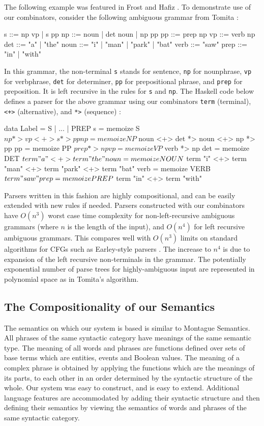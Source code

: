 \documentclass[../main.tex]{subfiles}
\begin{document}
\begin{refsection}
The following example was featured in Frost and Hafiz \cite{frosthafiz2008}. To demonstrate use of our combinators, consider the following ambiguous grammar from Tomita \cite{tomita1985}:
\begin{code}
	s    ::= np vp | s pp    np   ::= noun  | det noun | np pp
	pp   ::= prep np         vp   ::= verb np
	det  ::= "a"   | "the"   noun ::= "i"   | "man" | "park" | "bat"
	verb ::= "saw"           prep ::= "in"  | "with"
\end{code}
In this grammar, the non-terminal \texttt{s} stands for sentence, \texttt{np} for nounphrase, \texttt{vp} for verbphrase, \texttt{det} for determiner, \texttt{pp} for prepositional phrase, and \texttt{prep} for preposition.  It is left recursive in the rules for \texttt{s} and \texttt{np}.
The Haskell code below defines a parser for the above grammar using our combinators \texttt{term} (terminal), \texttt{<+>} (alternative), and \texttt{*>} (sequence) \cite{frosthafiz2008}:
\begin{code}
	data Label = S | ... | PREP
	s    = memoize S    $ np *> vp <+> s *> pp
	np   = memoize NP   $ noun <+> det *> noun <+> np *> pp
	pp   = memoize PP   $ prep *> np
	vp   = memoize VP   $ verb *> np
	det  = memoize DET  $ term "a" <+> term "the"
	noun = memoize NOUN
	$ term "i" <+> term "man" <+> term "park" <+> term "bat"
	verb = memoize VERB $ term "saw"
	prep = memoize PREP $ term "in" <+> term "with"
\end{code}
Parsers written in this fashion are highly compositional, and can be easily extended with new rules if needed.  Parsers constructed with our combinators have $O(n^3)$ worst case time complexity for non-left-recursive ambiguous  grammars (where $n$ is the  length of the input), and $O(n^4)$ for left recursive ambiguous grammars.  This compares well with $O(n^3)$ limits on standard algorithms for CFGs such as Earley-style parsers \cite{earley1970}.  The increase to $n^4$ is due to expansion  of  the  left  recursive non-terminals in the  grammar. The potentially exponential number of parse trees for highly-ambiguous input are represented in polynomial space as in Tomita’s algorithm.

\subsection{The Compositionality of our Semantics}

The semantics on which our system is based is similar to Montague Semantics. All phrases of the same syntactic category have meanings of the same semantic type. The meaning of all words and phrases are functions defined over sets of base terms which are entities, events and Boolean values. The meaning of a complex phrase is obtained by applying the functions which are the meanings of its parts, to each other in an order determined by the syntactic structure of the whole. Our system was easy to construct, and is easy to extend. Additional language features are accommodated by adding their syntactic structure and then defining their semantics by viewing the semantics of words and phrases of the same syntactic category.



\end{refsection}
\end{document}
